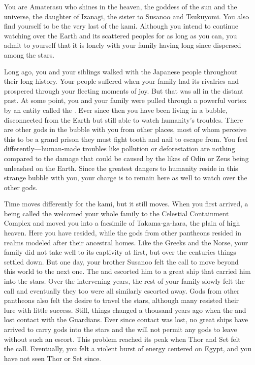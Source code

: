 \documentclass[char]{guardians}
\begin{document}
\name{\cAmaterasu{}}

You are Amaterasu who shines in the heaven, the goddess of the sun and the universe, the daughter of Izanagi, the sister to Susanoo and Tsukuyomi. You also find yourself to be the very last of the kami. Although you intend to continue watching over the Earth and its scattered peoples for as long as you can, you admit to yourself that it is lonely with your family having long since dispersed among the stars.

Long ago, you and your siblings walked with the Japanese people throughout their long history. Your people suffered when your family had its rivalries and prospered through your fleeting moments of joy. But that was all in the distant past. At some point, you and your family were pulled through a powerful vortex by an entity called the \cWarden{}. Ever since then you have been living in a bubble, disconnected from the Earth but still able to watch humanity's troubles. There are other gods in the bubble with you from other places, most of whom perceive this to be a grand prison they must fight tooth and nail to escape from. You feel differently---human-made troubles like pollution or deforestation are nothing compared to the damage that could be caused by the likes of Odin or Zeus being unleashed on the Earth. Since the greatest dangers to humanity reside in this strange bubble with you, your charge is to remain here as well to watch over the other gods.

Time moves differently for the kami, but it still moves. When you first arrived, a being called the \cCaretaker{} welcomed your whole family to the Celestial Containment Complex and moved you into a facsimile of Takama-ga-hara, the plain of high heaven. Here you have resided, while the gods from other pantheons resided in realms modeled after their ancestral homes. Like the Greeks and the Norse, your family did not take well to its captivity at first, but over the centuries things settled down. But one day, your brother Susanoo felt the call to move beyond this world to the next one. The \cCaretaker{} and \cWarden{} escorted him to a great ship that carried him into the stars. Over the intervening years, the rest of your family slowly felt the call and eventually they too were all similarly escorted away. Gods from other pantheons also felt the desire to travel the stars, although many resisted their lure with little success. Still, things changed a thousand years ago when the \cCaretaker{} and \cWarden{} lost contact with the Guardians. Ever since contact was lost, no great ships have arrived to carry gods into the stars and the \cWarden{} will not permit any gods to leave without such an escort. This problem reached its peak when Thor and Set felt the call. Eventually, you felt a violent burst of energy centered on Egypt, and you have not seen Thor or Set since.
\end{document}
